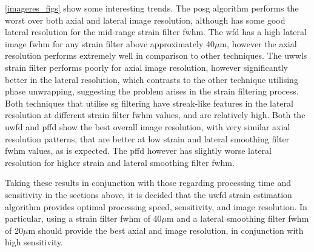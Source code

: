 \autoref{imageres_figs} show some interesting trends. The \ac{posg} algorithm performs the worst over both axial and lateral image resolution, although has some good lateral resolution for the mid-range strain filter \ac{fwhm}. The \ac{wfd} has a high lateral image \ac{fwhm} for any strain filter above approximately 40$\mu$m, however the axial resolution performs extremely well in comparison to other techniques. The \ac{uwwls} strain filter performs poorly for axial image resolution, however significantly better in the lateral resolution, which contrasts to the other technique utilising phase unwrapping, suggesting the problem arises in the strain filtering process. Both techniques that utilise \ac{sg} filtering have streak-like features in the lateral resolution at different strain filter \ac{fwhm} values, and are relatively high. Both the \ac{uwfd} and \ac{pffd} show the best overall image resolution, with very similar axial resolution patterns, that are better at low strain and lateral smoothing filter \ac{fwhm} values, as is expected. The \ac{pffd} however has slightly worse lateral resolution for higher strain and lateral smoothing filter \ac{fwhm}.

Taking these results in conjunction with those regarding processing time and sensitivity in the sections above, it is decided that the \ac{uwfd} strain estimation algorithm provides optimal processing speed, sensitivity, and image resolution. In particular, using a strain filter \ac{fwhm} of 40$\mu$m and a lateral smoothing filter \ac{fwhm} of 20$\mu$m should provide the best axial and image resolution, in conjunction with high sensitivity. 


